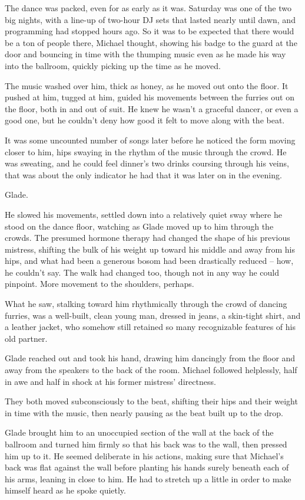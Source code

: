 The dance was packed, even for as early as it was.  Saturday was one of the two big nights, with a line-up of two-hour DJ sets that lasted nearly until dawn, and programming had stopped hours ago.  So it was to be expected that there would be a ton of people there, Michael thought, showing his badge to the guard at the door and bouncing in time with the thumping music even as he made his way into the ballroom, quickly picking up the time as he moved.

The music washed over him, thick as honey, as he moved out onto the floor.  It pushed at him, tugged at him, guided his movements between the furries out on the floor, both in and out of suit.  He knew he wasn't a graceful dancer, or even a good one, but he couldn't deny how good it felt to move along with the beat.

It was some uncounted number of songs later before he noticed the form moving closer to him, hips swaying in the rhythm of the music through the crowd.  He was sweating, and he could feel dinner's two drinks coursing through his veins, that was about the only indicator he had that it was later on in the evening.

Glade.

He slowed his movements, settled down into a relatively quiet sway where he stood on the dance floor, watching as Glade moved up to him through the crowds.  The presumed hormone therapy had changed the shape of his previous mistress, shifting the bulk of his weight up toward his middle and away from his hips, and what had been a generous bosom had been drastically reduced -- how, he couldn't say.  The walk had changed too, though not in any way he could pinpoint.  More movement to the shoulders, perhaps.

What he saw, stalking toward him rhythmically through the crowd of dancing furries, was a well-built, clean young man, dressed in jeans, a skin-tight shirt, and a leather jacket, who somehow still retained so many recognizable features of his old partner.

Glade reached out and took his hand, drawing him dancingly from the floor and away from the speakers to the back of the room.  Michael followed helplessly, half in awe and half in shock at his former mistress' directness.

They both moved subconsciously to the beat, shifting their hips and their weight in time with the music, then nearly pausing as the beat built up to the drop.

Glade brought him to an unoccupied section of the wall at the back of the ballroom and turned him firmly so that his back was to the wall, then pressed him up to it.  He seemed deliberate in his actions, making sure that Michael's back was flat against the wall before planting his hands surely beneath each of his arms, leaning in close to him.  He had to stretch up a little in order to make himself heard as he spoke quietly.

